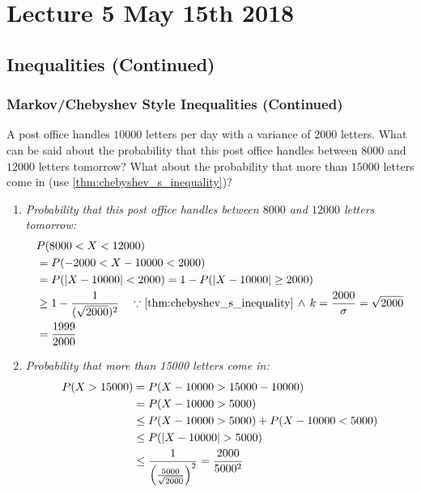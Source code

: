 \documentclass[notoc,notitlepage]{tufte-book}
\begin{document}



\chapter{Lecture 5 May 15th 2018}
\label{chp:lecture_5_may_15th_2018}

\section{Inequalities (Continued)}%
\label{sec:inequalities_continued}

\subsection{Markov/Chebyshev Style Inequalities (Continued)}%
\label{sub:markov_chebyshev_style_inequalities_continued}

\begin{eg}[Example 2.24]
  A post office handles $10000$ letters per day with a variance of $2000$ letters. What can be said about the probability that this post office handles between $8000$ and $12000$ letters tomorrow? What about the probability that more than $15000$ letters come in (use \cref{thm:chebyshev_s_inequality})?

  \begin{enumerate}
    \item \textit{Probability that this post office handles between $8000$ and $12000$ letters tomorrow:}
      \begin{align*}
        &P(8000 < X < 12000) \\
          &= P(-2000 < X - 10000 < 2000) \\
          &= P(\abs{X - 10000} < 2000) = 1 - P(\abs{X - 10000} \geq 2000) \\
          &\geq 1 - \frac{1}{(\sqrt{2000})^2} \quad \because \cref{thm:chebyshev_s_inequality} \, \land \, k = \frac{2000}{\sigma} = \sqrt{2000} \\
          &= \frac{1999}{2000}
      \end{align*}

    \item \textit{Probability that more than 15000 letters come in:} 
      \begin{align*}
        P(X > 15000) &= P(X - 10000 > 15000 - 10000) \\
          &= P(X - 10000 > 5000) \\
          &\leq P(X - 10000 > 5000) + P(X - 10000 < 5000) \\
          &\leq P(\left|X - 10000\right| > 5000) \\
          &\leq \frac{1}{\left( \frac{5000}{\sqrt{2000}} \right)^2} = \frac{2000}{5000^2}
      \end{align*}
  \end{enumerate}
\end{eg}
\end{document}
